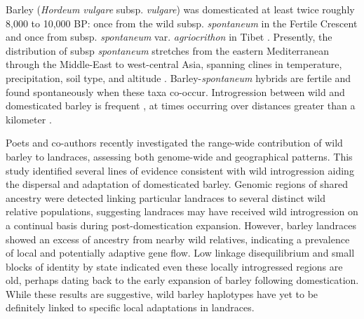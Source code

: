 \documentclass[11pt]{article}
\newcommand{\gmj}[1]{\textcolor{blue}{ \emph{\scriptsize  #1}} } %
\begin{document}
\begin{enumerate}
Barley (\emph{Hordeum vulgare} subsp. \emph{vulgare}) was domesticated at least twice roughly 8,000 to 10,000 BP: once from the wild subsp. \emph{spontaneum} in the Fertile Crescent and once from subsp. \emph{spontaneum} var. \emph{agriocrithon} in Tibet \cite{takahashi1955origin, badr2000origin, azhaguvel2007phylogenetic, haberer2015barley, ren2013tibet, dai2012tibet}.
Presently, the distribution of subsp \emph{spontaneum} stretches from the eastern Mediterranean through the Middle-East to west-central Asia, spanning clines in temperature, precipitation, soil type, and altitude \cite{nevo2010drought}.
Barley-\emph{spontaneum} hybrids are fertile and found spontaneously when these taxa co-occur.
Introgression between wild and domesticated barley is frequent \cite{dai2012tibet}, at times occurring over distances greater than a kilometer \cite{hillman2001new}.


Poets and co-authors \cite{Poets2015} recently investigated the range-wide contribution of wild barley to landraces, assessing both genome-wide and geographical patterns.
This study identified several lines of evidence consistent with wild introgression aiding the dispersal and adaptation of domesticated barley.
Genomic regions of shared ancestry were detected linking particular landraces to several distinct wild relative populations, suggesting landraces may have received wild introgression on a continual basis during post-domestication expansion.
However, barley landraces showed an excess of ancestry from nearby wild relatives, indicating a prevalence of local and potentially adaptive gene flow.
Low linkage disequilibrium and small blocks of identity by state indicated even these locally introgressed regions are old, perhaps dating back to the early expansion of barley following domestication.
While these results are suggestive, wild barley haplotypes have yet to be definitely linked to specific local adaptations in landraces.


\end{enumerate}
\end{document}
